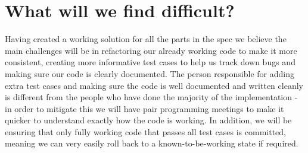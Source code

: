 \documentclass[12pt,twoside]{article}
\begin{document}
\section{What will we find difficult?}
Having created a working solution for all the parts in the spec we believe the main challenges will be in refactoring our already working code to make it more consistent, creating more informative test cases to help us track down bugs and making sure our code is clearly documented. The person responsible for adding extra test cases and making sure the code is well documented and written cleanly is different from the people who have done the majority of the implementation - in order to mitigate this we will have pair programming meetings to make it quicker to understand exactly how the code is working. In addition, we will be ensuring that only fully working code that passes all test cases is committed, meaning we can very easily roll back to a known-to-be-working state if required.
\end{document}
